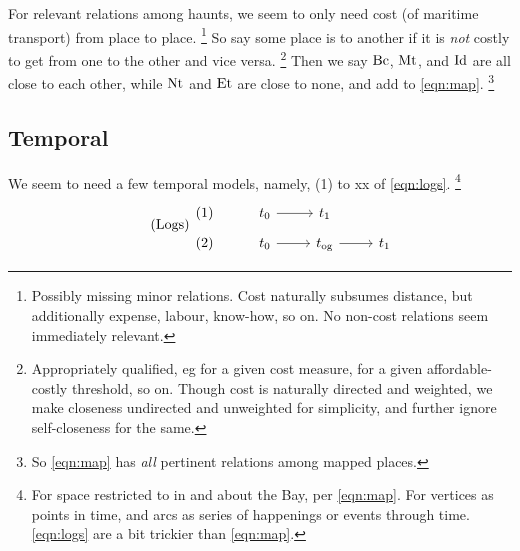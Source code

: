 		For relevant relations among haunts, we seem to only need cost (of maritime transport) from place to place.%
		\footnote{Possibly missing minor relations. Cost naturally subsumes distance, but additionally expense, labour, know-how, so on. No non-cost relations seem immediately relevant.}
		So say some place is  to another if it is \emph{not} costly to get from one to the other and vice versa.%
		\footnote{Appropriately qualified, eg for a given cost measure, for a given affordable-costly threshold, so on. Though cost is naturally directed and weighted, we make closeness undirected and unweighted for simplicity, and further ignore self-closeness for the same.}
		Then we say \(\operatorname{Bc}\), \(\operatorname{Mt}\), and \(\operatorname{Id}\) are all close to each other, while \(\operatorname{Nt}\) and \(\operatorname{Et}\) are close to none, and add to \ref{eqn:map}.%
		\footnote{So \ref{eqn:map} has \emph{all} pertinent relations among mapped places.}
	\subsection{Temporal}
	\label{ss:temporal}
		We seem to need a few temporal models, namely, (1) to xx of \ref{eqn:logs}.%
		\footnote{For space restricted to in and about the Bay, per \ref{eqn:map}. For vertices as points in time, and arcs as series of happenings or events through time. \ref{eqn:logs} are a bit trickier than \ref{eqn:map}.} %
		\begin{equation}
		\tag{Logs}
		\label{eqn:logs}
		\begin{tikzcd}[row sep=tiny]
		(1) &t_0 \rar &t_1\\
		(2) &t_0 \rar &t_{\og} \rar &t_1
		\end{tikzcd}
		\end{equation}
	
